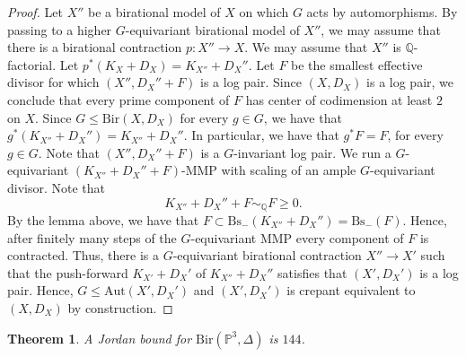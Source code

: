 \documentclass[a4paper,12pt,oneside]{amsart}
\numberwithin{equation}{section}
\newtheorem{theorem}{Theorem}[section]
\theoremstyle{definition}
\theoremstyle{remark}
\begin{document}
\begin{proof}
Let $X''$ be a birational model of $X$ on which $G$ acts by automorphisms. By passing to a higher $G$-equivariant birational model of $X''$, we may assume that there is a birational contraction $p: X'' \to X$. We may assume that $X''$ is $\mathbb{Q}$-factorial. Let $p^*(K_X+D_X) = K_{X''} + D_X''$. Let $F$ be the smallest effective divisor for which $(X'', D_X''+F)$ is a log pair. Since $(X,D_X)$ is a log pair, we conclude that every prime component of $F$ has center of codimension at least $2$ on $X$. Since $G \leqslant \mathrm{Bir}(X,D_X)$ for every $g \in G$, we have that $g^*(K_{X''} + D_X'') = K_{X''} + D_X''$. In particular, we have that $g^*F = F$, for every $g \in G$. Note that $(X'', D_X''+F)$ is a $G$-invariant log pair. We run a $G$-equivariant $(K_{X''} + D_X''+F)$-MMP with scaling of an ample $G$-equivariant divisor. Note that
\[
K_{X''} + D_X'' + F \sim_{\mathbb{Q}} F \geq 0.
\]
By the lemma above, we have that $F \subset \mathrm{Bs}_{-}(K_{X''} + D_X'') = \mathrm{Bs}_{-}(F)$. Hence, after finitely many steps of the $G$-equivariant MMP every component of $F$ is contracted. Thus, there is a $G$-equivariant birational contraction $X'' \to X'$ such that the push-forward $K_{X'} + D_X'$ of $K_{X''} + D_X''$ satisfies that $(X',D_X')$ is a log pair. Hence, $G \leqslant \mathrm{Aut}(X',D_X')$ and $(X',D_X')$ is crepant equivalent to $(X,D_X)$ by construction. \qedhere
\end{proof}


\begin{theorem}
 A Jordan bound for $\mathrm{Bir}(\mathbb{P}^3, \Delta)$ is $144$.
\end{theorem}
\end{document}
